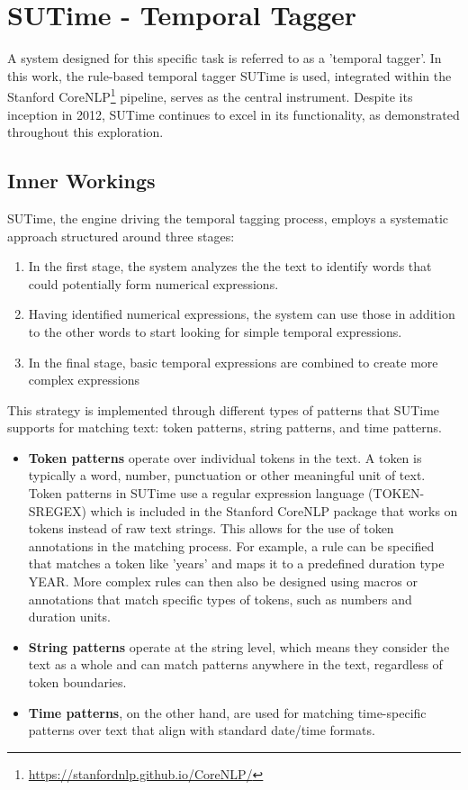 \documentclass[a4paper,10pt]{report} %
\begin{document}
\section{SUTime - Temporal Tagger}
A system designed for this specific task is referred to as a 'temporal tagger'. In this work, the rule-based temporal tagger SUTime \cite{sutime} is used, integrated within the Stanford CoreNLP\footnote{\url{https://stanfordnlp.github.io/CoreNLP/}} pipeline, serves as the central instrument. Despite its inception in 2012, SUTime continues to excel in its functionality, as demonstrated throughout this exploration.

\subsection{Inner Workings}
SUTime, the engine driving the temporal tagging process, employs a systematic approach structured around three stages:

\begin{enumerate}
  \item In the first stage, the system analyzes the the text to identify words that could potentially form numerical expressions.

  \item Having identified numerical expressions, the system can use those in addition to the other words to start looking for simple temporal expressions.

  \item In the final stage, basic temporal expressions are combined to create more complex expressions
\end{enumerate}

This strategy is implemented through different types of patterns that SUTime supports for matching text: token patterns, string patterns, and time patterns.

\begin{itemize}
  \item \textbf{Token patterns} operate over individual tokens in the text. A token is typically a word, number, punctuation or other meaningful unit of text. Token patterns in SUTime use a regular expression language (TOKEN-SREGEX) which is included in the Stanford CoreNLP package that works on tokens instead of raw text strings. This allows for the use of token annotations in the matching process. For example, a rule can be specified that matches a token like 'years' and maps it to a predefined duration type YEAR. More complex rules can then also be designed using macros or annotations that match specific types of tokens, such as numbers and duration units.

  \item \textbf{String patterns} operate at the string level, which means they consider the text as a whole and can match patterns anywhere in the text, regardless of token boundaries.

  \item \textbf{Time patterns}, on the other hand, are used for matching time-specific patterns over text that align with standard date/time formats.
\end{itemize}
\end{document}
